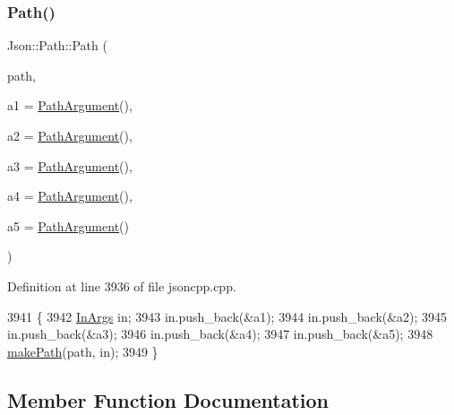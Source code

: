 \subsubsection{\texorpdfstring{Path()}{Path()}}
{\footnotesize\ttfamily Json\+::\+Path\+::\+Path (\begin{DoxyParamCaption}\item[{const \hyperlink{json_8h_a1e723f95759de062585bc4a8fd3fa4be}{J\+S\+O\+N\+C\+P\+P\+\_\+\+S\+T\+R\+I\+NG} \&}]{path,  }\item[{const \hyperlink{class_json_1_1_path_argument}{Path\+Argument} \&}]{a1 = {\ttfamily \hyperlink{class_json_1_1_path_argument}{Path\+Argument}()},  }\item[{const \hyperlink{class_json_1_1_path_argument}{Path\+Argument} \&}]{a2 = {\ttfamily \hyperlink{class_json_1_1_path_argument}{Path\+Argument}()},  }\item[{const \hyperlink{class_json_1_1_path_argument}{Path\+Argument} \&}]{a3 = {\ttfamily \hyperlink{class_json_1_1_path_argument}{Path\+Argument}()},  }\item[{const \hyperlink{class_json_1_1_path_argument}{Path\+Argument} \&}]{a4 = {\ttfamily \hyperlink{class_json_1_1_path_argument}{Path\+Argument}()},  }\item[{const \hyperlink{class_json_1_1_path_argument}{Path\+Argument} \&}]{a5 = {\ttfamily \hyperlink{class_json_1_1_path_argument}{Path\+Argument}()} }\end{DoxyParamCaption})}



Definition at line 3936 of file jsoncpp.\+cpp.


\begin{DoxyCode}
3941                                    \{
3942   \hyperlink{class_json_1_1_path_ab29d7b2fc896c7d3c5ed4609af3a3f23}{InArgs} in;
3943   in.push\_back(&a1);
3944   in.push\_back(&a2);
3945   in.push\_back(&a3);
3946   in.push\_back(&a4);
3947   in.push\_back(&a5);
3948   \hyperlink{class_json_1_1_path_a362a420a47acb1a1f9c79173cbfef94d}{makePath}(path, in);
3949 \}
\end{DoxyCode}


\subsection{Member Function Documentation}
\mbox{\label{class_json_1_1_path_ae65717a5fbc35b1336cbf783b15aad2e}} 
